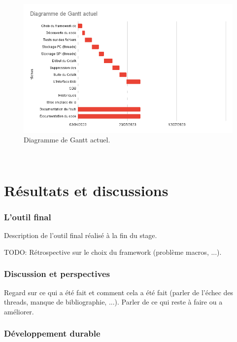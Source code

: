 \documentclass[a4paper]{article}
\begin{document}
\begin{figure}[h!]
  \begin{center}
  \includegraphics[scale=0.6]{./img/current-gantt.png}
  \caption{Diagramme de Gantt actuel.}
  \end{center}
\end{figure}~\\
\clearpage
\part{Résultats et discussions}

\section{L'outil final}

Description de l'outil final réalisé à la fin du stage.

TODO: Rétrospective sur le choix du framework (problème macros, ...).

\clearpage

\section{Discussion et perspectives}

Regard sur ce qui a été fait et comment cela a été fait (parler de l'échec
des threads, manque de bibliographie, ...). Parler de ce qui reste à faire ou a
améliorer.

\clearpage

\section{Développement durable}
\end{document}
